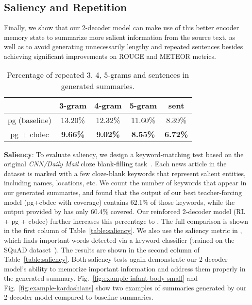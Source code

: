 \documentclass[11pt,a4paper]{article}
\def\figref#1{Fig.~\ref{#1}}
\def\tabref#1{Table~\ref{#1}}
\begin{document}
\subsection{Saliency and Repetition}
Finally, we show that our 2-decoder model can make use of this better encoder memory state to summarize more salient information from the source text, as well as to avoid generating unnecessarily lengthy and repeated sentences besides achieving significant improvements on ROUGE and METEOR metrics.

\begin{table}[t] 
\begin{small}
\centering
\begin{tabular}{|c|c|c|c|c|} 
\hline
& 3-gram & 4-gram & 5-gram & sent \\
\hline
pg (baseline) & 13.20\% & 12.32\% & 11.60\% &8.39\%\\
pg + cbdec & \textbf{9.66\%} & \textbf{9.02\%} & \textbf{8.55\%} &\textbf{6.72\%}\\
\hline
\end{tabular}
\vspace{-3pt}
\caption{Percentage of repeated 3, 4, 5-grams and sentences in generated summaries.}
\label{table:repetition}
\vspace{-5pt}
\end{small}
\end{table}


\noindent\textbf{Saliency}:
To evaluate saliency, we design a keyword-matching test based on the original \emph{CNN/Daily Mail} cloze blank-filling task~\cite{Hermann:15}. Each news article in the dataset is marked with a few cloze-blank keywords that represent salient entities, including names, locations, etc. 
We count the number of keywords that appear in our generated summaries, and found that the output of our best teacher-forcing model (pg+cbdec with coverage) contains 62.1\% of those keywords, while the output provided by  has only 60.4\% covered. Our reinforced 2-decoder model (RL + pg + cbdec) further increases this percentage to .
The full comparison is shown in the first column of \tabref{table:saliency}. 
We also use the saliency metric in , which finds important words detected via a keyword classifier (trained on the SQuAD dataset~\cite{rajpurkar2016squad}). The results are shown in the second column of \tabref{table:saliency}.
Both saliency tests again demonstrate our 2-decoder model's ability to memorize important information and address them properly in the generated summary. \figref{fig:example-infant-body-small} and \figref{fig:example-kardashians} show two examples of summaries generated by our 2-decoder model compared to baseline summaries.
\end{document}
